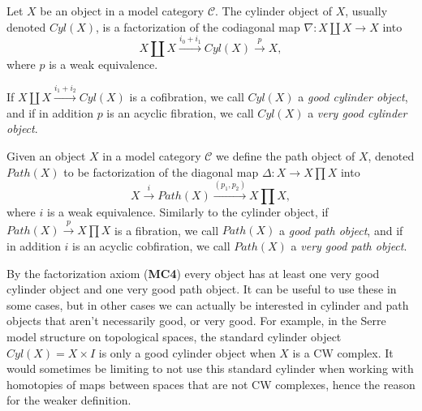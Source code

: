 \begin{definition}
\label{def:cylinder_object}
Let $X$ be an object in a model category $\mathcal{C}$. The cylinder object of $X$, usually denoted $Cyl(X)$, is a factorization of the codiagonal map $\nabla: X\coprod X\longrightarrow X$ into
\begin{equation*}
    X\coprod X\overset{i_0+i_1}\longrightarrow Cyl(X) \overset{p}\longrightarrow X,
\end{equation*} 
where $p$ is a weak equivalence. 

If $X\coprod X\overset{i_1 + i_2}\longrightarrow Cyl(X)$ is a cofibration, we call $Cyl(X)$ a \emph{good cylinder object}, and if in addition $p$ is an acyclic fibration, we call $Cyl(X)$ a \emph{very good cylinder object}.
\end{definition}

\begin{definition}
\label{def:path_object}
Given an object $X$ in a model category $\mathcal{C}$ we define the path object of $X$, denoted $Path(X)$ to be factorization of the diagonal map $\Delta\colon X \longrightarrow X\prod X$ into
\begin{equation*}
     X \overset{i}\longrightarrow Path(X) \overset{(p_1,p_2)}\longrightarrow X \prod X,
\end{equation*}
where $i$ is a weak equivalence. Similarly to the cylinder object, if $Path(X)\overset{p}\longrightarrow X\prod X$ is a fibration, we call $Path(X)$ a \emph{good path object}, and if in addition $i$ is an acyclic cobfiration, we call $Path(X)$ a \emph{very good path object}.
\end{definition}

By the factorization axiom (\textbf{MC4}) every object has at least one very good cylinder object and one very good path object. It can be useful to use these in some cases, but in other cases we can actually be interested in cylinder and path objects that aren't necessarily good, or very good. For example, in the Serre model structure on topological spaces, the standard cylinder object $Cyl(X)=X\times I$ is only a good cylinder object when $X$ is a CW complex. It would sometimes be limiting to not use this standard cylinder when working with homotopies of maps between spaces that are not CW complexes, hence the reason for the weaker definition. 


